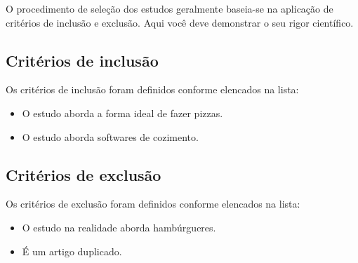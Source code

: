 O procedimento de seleção dos estudos geralmente baseia-se na aplicação de critérios de inclusão e exclusão. Aqui você deve demonstrar o seu rigor científico.

\subsection{Critérios de inclusão}
\label{sub:criterios_inclusao}

Os critérios de inclusão foram definidos conforme elencados na lista:

\begin{itemize}
    \item O estudo aborda a forma ideal de fazer pizzas.
    \item O estudo aborda softwares de cozimento.
\end{itemize}

\subsection{Critérios de exclusão}
\label{sub:criterios_exclusao}

Os critérios de exclusão foram definidos conforme elencados na lista:

\begin{itemize}
    \item O estudo na realidade aborda hambúrgueres.
    \item É um artigo duplicado.
\end{itemize}


% 





